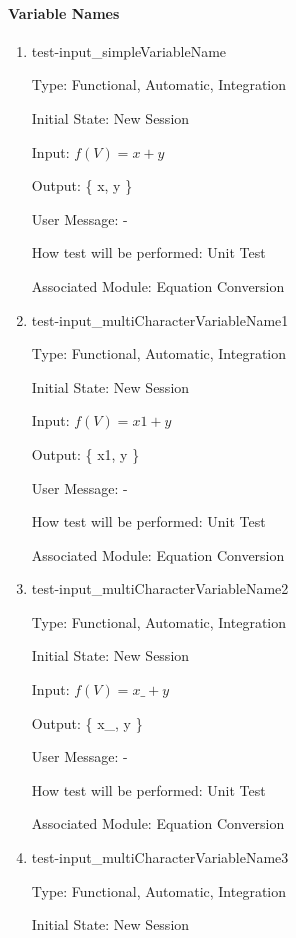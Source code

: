 \documentclass[12pt, titlepage]{article}
\begin{document}
\paragraph{Variable Names}

\begin{enumerate}
	
	\item{test-input\_simpleVariableName}
	
	Type: Functional, Automatic, Integration
	
	Initial State: New Session
	
	Input: $f(V) = x + y$
	
	Output: \{ x, y \}
	
	User Message: - 
	
	How test will be performed: Unit Test
	
	Associated Module: Equation Conversion\\
	
	\item{test-input\_multiCharacterVariableName1}
	
	Type: Functional, Automatic, Integration
	
	Initial State: New Session
	
	Input: $f(V) = x1 + y$
	
	Output: \{ x1, y \}
	
	User Message: - 
	
	How test will be performed: Unit Test
	
	Associated Module: Equation Conversion\\
	
	\item{test-input\_multiCharacterVariableName2}
	
	Type: Functional, Automatic, Integration
	
	Initial State: New Session
	
	Input: $f(V) = x\_ + y$
	
	Output: \{ x\_, y \}
	
	User Message: - 
	
	How test will be performed: Unit Test
	
	Associated Module: Equation Conversion\\
	
	\item{test-input\_multiCharacterVariableName3}
	
	Type: Functional, Automatic, Integration
	
	Initial State: New Session
	

\end{enumerate}
\end{document}

